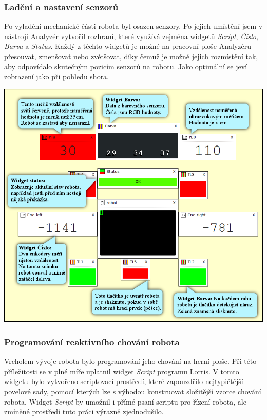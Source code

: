 \documentclass[12pt, a4paper, oneside]{article}
\newcommand{\It}{\textit}  %
\begin{document}
\subsubsection{Ladění a nastavení senzorů}
Po vyladění mechanické části robota byl osazen senzory. Po jejich umístění jsem v nástroji Analyzér vytvořil rozhraní, které využívá zejména widgetů \It{Script}, \It{Číslo}, \It{Barva} a \It{Status}. Každý z těchto widgetů je možné na pracovní ploše Analyzéru přesouvat, zmenšovat nebo zvětšovat, díky čemuž je možné jejich rozmístění tak, aby odpovídalo skutečným pozicím senzorů na robotu. Jako optimální se jeví zobrazení jako při pohledu shora.
\vspace{10mm}
\begin{center}
\includegraphics[width=\textwidth]{img/sensors_david.png}
\end{center}

\newpage
\subsubsection{Programování reaktivního chování robota}
Vrcholem vývoje robota bylo programování jeho chování na herní ploše. Při této příležitosti se v plné míře uplatnil widget \It{Script} programu Lorris. V tomto widgetu bylo vytvořeno scriptovací prostředí, které zapouzdřilo nejtypičtější povelové sady, pomocí kterých lze s výhodou konstruovat složitější vzorce chování robota. Widget \It{Script} by umožnil i přímé psaní scriptu pro řízení robota, ale zmíněné prostředí tuto práci výrazně zjednodušilo.
\end{document}
